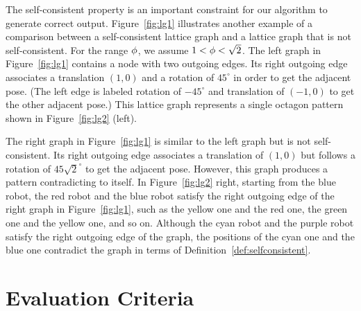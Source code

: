
The self-consistent property is an important constraint for our algorithm to generate correct output. Figure~\ref{fig:lg1} illustrates another example of a comparison between a self-consistent lattice graph and a lattice graph that is not self-consistent. 
%
For the range $\phi$, we assume $1 < \phi < \sqrt{2}$.
The left graph in Figure~\ref{fig:lg1} contains a node with two outgoing edges. 
Its right outgoing edge associates a translation $(1,0)$ and a rotation of $45^{\circ}$ in order to get the adjacent pose.
(The left edge is labeled rotation of $-45^{\circ}$ and translation of $(-1,0)$ to get the other adjacent pose.) 
This lattice graph represents a single octagon pattern shown in Figure~\ref{fig:lg2} (left).

The right graph in Figure~\ref{fig:lg1} is similar to the left graph but is not self-consistent.
Its right outgoing edge associates a translation of $(1,0)$ but follows a rotation of $45\sqrt{2}^{\circ}$ to get the adjacent pose. 
However, this graph produces a pattern contradicting to itself.
In Figure~\ref{fig:lg2} right, starting from the blue robot, the red robot and the blue robot satisfy the right outgoing edge of the right graph in Figure~\ref{fig:lg1}, such as the yellow one and the red one, the green one and the yellow one, and so on.
Although the cyan robot and the purple robot satisfy the right outgoing edge of the graph, the positions of the cyan one and the blue one contradict the graph in terms of Definition~\ref{def:selfconsistent}.


\section{Evaluation Criteria}
\label{sec:mrf-eval}

